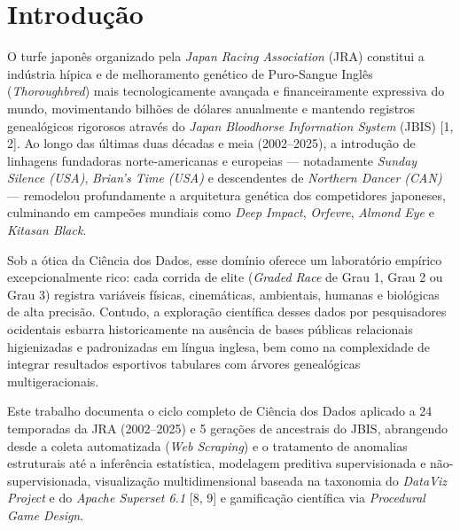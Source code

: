 \documentclass[conference]{IEEEtran}
\begin{document}
\section{Introdução}
O turfe japonês organizado pela \textit{Japan Racing Association} (JRA) constitui a indústria hípica e de melhoramento genético de Puro-Sangue Inglês (\textit{Thoroughbred}) mais tecnologicamente avançada e financeiramente expressiva do mundo, movimentando bilhões de dólares anualmente e mantendo registros genealógicos rigorosos através do \textit{Japan Bloodhorse Information System} (JBIS) [1, 2]. Ao longo das últimas duas décadas e meia (2002--2025), a introdução de linhagens fundadoras norte-americanas e europeias --- notadamente \textit{Sunday Silence (USA)}, \textit{Brian's Time (USA)} e descendentes de \textit{Northern Dancer (CAN)} --- remodelou profundamente a arquitetura genética dos competidores japoneses, culminando em campeões mundiais como \textit{Deep Impact}, \textit{Orfevre}, \textit{Almond Eye} e \textit{Kitasan Black}.

Sob a ótica da Ciência dos Dados, esse domínio oferece um laboratório empírico excepcionalmente rico: cada corrida de elite (\textit{Graded Race} de Grau 1, Grau 2 ou Grau 3) registra variáveis físicas, cinemáticas, ambientais, humanas e biológicas de alta precisão. Contudo, a exploração científica desses dados por pesquisadores ocidentais esbarra historicamente na ausência de bases públicas relacionais higienizadas e padronizadas em língua inglesa, bem como na complexidade de integrar resultados esportivos tabulares com árvores genealógicas multigeracionais.

Este trabalho documenta o ciclo completo de Ciência dos Dados aplicado a 24 temporadas da JRA (2002--2025) e 5 gerações de ancestrais do JBIS, abrangendo desde a coleta automatizada (\textit{Web Scraping}) e o tratamento de anomalias estruturais até a inferência estatística, modelagem preditiva supervisionada e não-supervisionada, visualização multidimensional baseada na taxonomia do \textit{DataViz Project} e do \textit{Apache Superset 6.1} [8, 9] e gamificação científica via \textit{Procedural Game Design}.
\end{document}
